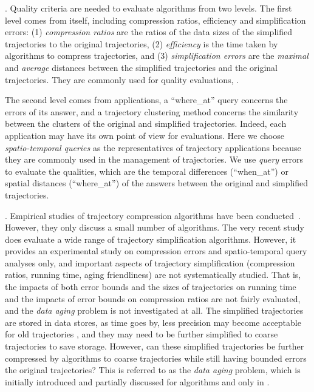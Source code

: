 {.
{Quality criteria are needed to evaluate \lsa algorithms from two levels. The first level comes from \lsa itself, including compression ratios, efficiency and simplification errors:
	(1) \emph{compression ratios} are the ratios of the data sizes of the simplified trajectories to the original trajectories,
	(2) \emph{efficiency} is the time taken by \lsa algorithms to compress trajectories, and
	(3) \emph{simplification errors} are the \emph{maximal} and \emph{average} distances between the simplified trajectories and the original trajectories.
They are commonly used for quality evaluations, \eg \cite{Muckell:Compression, Liu:BQS, Lin:Cised, Long:Direction, Zhang:Evaluation}.}%
	
	
{The second level comes from applications, \eg a ``where\_at'' query \cite{Cao:Spatio,Trajcevski:Uncertainty} concerns the errors of its answer, and a trajectory clustering method concerns the similarity between the clusters of the original and simplified trajectories. Indeed, each application may have its own point of view for evaluations.}	
%
{Here we choose \emph{spatio-temporal queries} \cite{Cao:Spatio,Trajcevski:Uncertainty} as the representatives of trajectory applications because they are commonly used in the management of trajectories.}
%
{We use \emph{query} errors to evaluate the qualities, which are the temporal differences (\eg ``when\_at'') or spatial distances (\eg ``where\_at'') of the answers  between the original and simplified trajectories.}






. Empirical studies of trajectory compression algorithms have been conducted~\cite{Muckell:Compression,MuckellHLR10}. However, they only discuss a small number of algorithms.
%
The very recent study \cite{Zhang:Evaluation} does evaluate a wide range of trajectory simplification algorithms.
However, it provides {an experimental study} on compression errors and spatio-temporal query analyses only, and important aspects of trajectory simplification (compression ratios, running time, aging friendliness) are not systematically studied.
{That is, the impacts of both error bounds and the sizes of trajectories on running time and the impacts of  error bounds on compression ratios are not fairly evaluated, and the \emph{data aging} problem is not investigated at all.} The simplified trajectories are stored in data stores, as time goes by, less precision may become acceptable for old trajectories \cite{Cao:Spatio}, and they may need to be further simplified to coarse trajectories to save storage. However, can these simplified trajectories be further compressed by \lsa algorithms to coarse trajectories while still having bounded errors \wrt the original trajectories? This is referred to as the \emph{data aging} problem, which is initially introduced and partially discussed for algorithms \opt and \dpa only in \cite{Cao:Spatio}.

}
